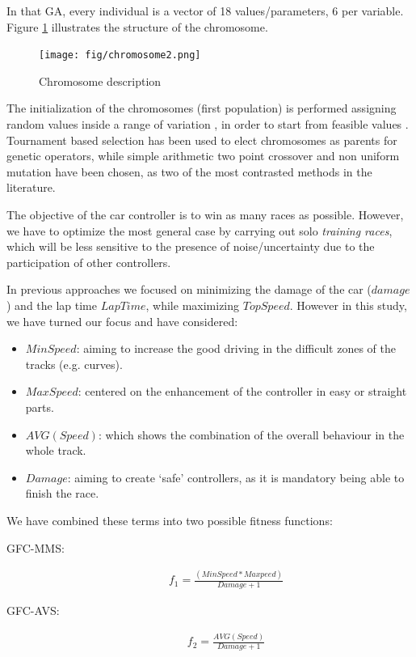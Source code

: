 \documentclass[conference]{IEEEtran}
\begin{document}
In that GA, every individual is a vector of 18 values/parameters, 6 per variable. Figure \ref {fig:cromosome} illustrates the structure of the chromosome.
\begin{figure}[!ht]	
  \begin{center}
    \texttt{[image: fig/chromosome2.png]}
    \caption{Chromosome description}
    \label{fig:cromosome}	
  \end{center}	
\end{figure}

The initialization of the chromosomes (first population) is performed
assigning random values inside a range of variation
\cite{GAs_Goldberg89}, in order to start from feasible values
\cite{evo17}. 
Tournament based selection has been used to elect chromosomes as
parents for genetic operators, while simple arithmetic two point
crossover \cite{crossGA2017} and non uniform mutation
\cite{mutation1997} have been chosen, as two of the most contrasted
methods in the literature. 



The objective of the car controller is to win as many races as
possible. However, we have to optimize the most general case by
carrying out solo {\em training races}, which will be less sensitive to the presence of noise/uncertainty due to the participation of other controllers.

In previous approaches we focused on minimizing the damage of
the car ($damage$) and the lap time $LapTime$, while
maximizing $TopSpeed$. However in this study, we have turned our focus and have considered:
\begin{itemize}
\item $MinSpeed$: aiming to increase the good driving in the difficult zones of the tracks (e.g. curves).
\item $MaxSpeed$: centered on the enhancement of the controller in easy or straight parts.
\item $AVG(Speed)$: which shows the combination of the overall behaviour in the whole track.
\item $Damage$: aiming to create `safe' controllers, as it is mandatory being able to finish the race.
\end{itemize} 
%
We have combined these terms into two possible fitness functions:

\begin{description}
	\item[GFC-MMS:]  
	\begin{equation} \label{fit1}
	\begin{array}{ll}
	f_{1} =   \frac{(MinSpeed*Maxpeed) }{Damage+1}
	\end{array}
	\end{equation}
	\item[GFC-AVS:] 
	\begin{equation} \label{fit2}
	\begin{array}{lll}
	f_{2}= \frac{AVG(Speed)}{Damage+1}
	\end{array}
	\end{equation}	
\end{description} 
\end{document}
